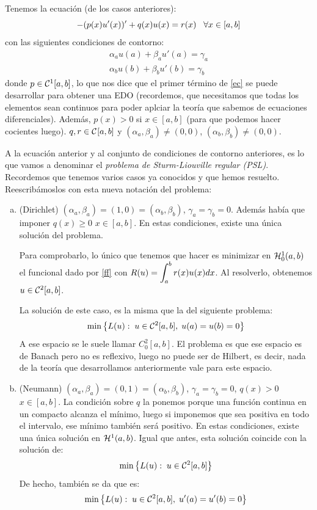 Tenemos la ecuación (de los casos anteriores):
\begin{equation}\label{ec}
-(p(x)u'(x))'+q(x)u(x)=r(x) \espacio \forall x\in[a,b]
\end{equation}
con las siguientes condiciones de contorno:
\[
\begin{array}{c}
\alpha_au(a)+\beta_au'(a)=\gamma_a\\
\alpha_bu(b)+\beta_bu'(b)=\gamma_b
\end{array}
\]
donde $p\in\continuas[1]$, lo que nos dice que el primer término de \eqref{ec} se puede desarrollar para obtener una EDO (recordemos, que necesitamos que todas los elementos sean continuos para poder aplciar la teoría que sabemos de ecuaciones diferenciales). Además, $p(x)>0$ si $x\in[a,b]$ (para que podemos hacer cocientes luego). $q,r\in\continuas$ y $(\alpha_a,\beta_a)\neq(0,0)$, $(\alpha_b,\beta_b)\neq(0,0)$.

A la ecuación anterior y al conjunto de condiciones de contorno anteriores, es lo que vamos a denominar el \textit{problema de Sturm-Liouville regular (PSL)}. Recordemos que tenemos varios casos ya conocidos y que hemos resuelto. Reescribámoslos con esta nueva notación del problema:
\begin{enumerate}[(a)]
\item (Dirichlet) $(\alpha_a,\beta_a)=(1,0)=(\alpha_b,\beta_b)$, $\gamma_a=\gamma_b=0$. Además había que imponer $q(x)\geq 0$ $x\in[a,b]$. En estas condiciones, existe una única solución del problema.

Para comprobarlo, lo único que tenemos que hacer es minimizar en $\sobolevcero{1}$ el funcional dado por \eqref{ff} con $R(u)=\integral{a}{b}{r(x)u(x)dx}$. Al resolverlo, obtenemos $u\in\continuas[2]$.

La solución de este caso, es la misma que la del siguiente problema:
\[
\min\left\{L(u):\; u\in\continuas[2],\; u(a)=u(b)=0\right\}
\]
A ese espacio se le suele llamar $C_0^2[a,b]$. El problema es que ese espacio es de Banach pero no es reflexivo, luego no puede ser de Hilbert, es decir, nada de la teoría que desarrollamos anteriormente vale para este espacio.

\item (Neumann) $(\alpha_a,\beta_a)=(0,1)=(\alpha_b,\beta_b)$, $\gamma_a=\gamma_b=0$, $q(x)>0$ $x\in[a,b].$ La condición sobre $q$ la ponemos porque una función continua en un compacto alcanza el mínimo, luego si imponemos que sea positiva en todo el intervalo, ese mínimo también será positivo. En estas condiciones, existe una única solución en $\sobolev{1}$. Igual que antes, esta solución coincide con la solución de:
\[
\min\left\{L(u):\; u\in\continuas[2]\right\}
\]
De hecho, también se da que es:
\[
\min\left\{L(u):\; u\in\continuas[2],\; u'(a)=u'(b)=0\right\}
\]
\end{enumerate}

